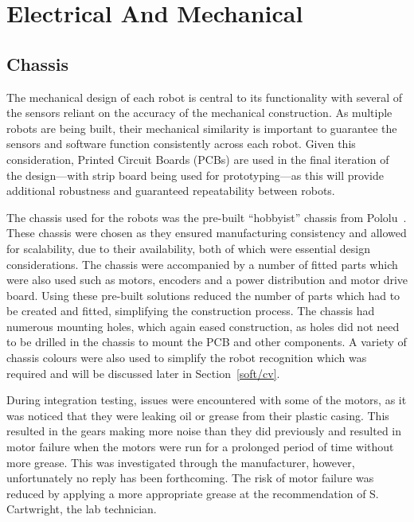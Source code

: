 
\chapter{Electrical And Mechanical}\label{electrical}

\section{Chassis}\label{mech/chassis}
The mechanical design of each robot is central to its 
functionality with several of the sensors
reliant on the accuracy of the mechanical construction. As 
multiple robots are being built, 
their mechanical similarity is important to guarantee the 
sensors and software function consistently across each robot. 
Given this consideration, Printed Circuit Boards (PCBs) are used in 
the final iteration of the design---with strip board being used for 
prototyping---as this will provide additional robustness and 
guaranteed repeatability between robots.

The chassis used for the robots was the pre-built ``hobbyist'' 
chassis from Pololu~\cite{pololuchassis}. These chassis were 
chosen as they ensured manufacturing consistency and allowed 
for scalability, due to their availability, both of which were 
essential design considerations. The chassis were accompanied by 
a number of fitted parts which were also used such as motors, 
encoders and a power distribution and motor drive board. Using these pre-built 
solutions reduced the number of parts which had to be created 
and fitted, simplifying the construction process.
The chassis had numerous mounting holes, which again eased 
construction, as holes did not need to be drilled in the chassis 
to mount the PCB and other components. A variety of chassis 
colours were also used to simplify the robot recognition which 
was required and will be discussed later in Section~\ref{soft/cv}. 

During integration testing, issues were encountered with some of the motors, 
as it was noticed that they 
were leaking oil or grease from their plastic casing. This 
resulted in the gears making more noise than they did previously 
and resulted in motor failure when the motors were run for a 
prolonged period of time without more grease. This was 
investigated through the manufacturer, however, unfortunately no 
reply has been forthcoming. The risk of motor failure was 
reduced by applying a more appropriate grease at the 
recommendation of S. Cartwright, the lab technician.  

